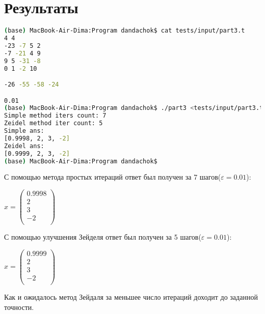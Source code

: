 \section*{Результаты}

\begin{lstlisting}[language=bash]
(base) MacBook-Air-Dima:Program dandachok$ cat tests/input/part3.t
4 4
-23 -7 5 2
-7 -21 4 9
9 5 -31 -8
0 1 -2 10

-26 -55 -58 -24

0.01
(base) MacBook-Air-Dima:Program dandachok$ ./part3 <tests/input/part3.t
Simple method iters count: 7
Zeidel method iter count: 5
Simple ans:
[0.9998, 2, 3, -2]
Zeidel ans:
[0.9999, 2, 3, -2]
(base) MacBook-Air-Dima:Program dandachok$ 
\end{lstlisting}

С помощью метода простых итераций ответ был получен 
за 7 шагов($\varepsilon = 0.01$):

$x = \begin{pmatrix}
    0.9998 \\
    2 \\
    3 \\
    -2 \\
\end{pmatrix}$

С помощью улучшения Зейделя ответ был получен 
за 5 шагов($\varepsilon = 0.01$): 

$x = \begin{pmatrix}
    0.9999 \\
    2 \\
    3 \\
    -2 \\
\end{pmatrix}$

Как и ожидалось метод Зейдаля за меньшее число итераций доходит 
до заданной точности.

\pagebreak